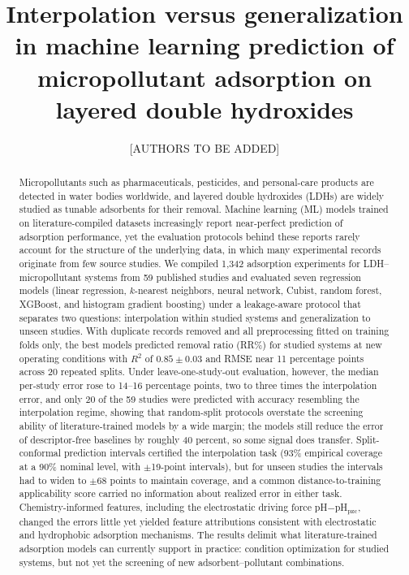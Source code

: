 \documentclass[review,12pt,authoryear]{elsarticle}
\begin{document}
\begin{frontmatter}

\title{Interpolation versus generalization in machine learning prediction
of micropollutant adsorption on layered double hydroxides}

\author[inst1]{[AUTHORS TO BE ADDED]}

\begin{abstract}
Micropollutants such as pharmaceuticals, pesticides, and personal-care
products are detected in water bodies worldwide, and layered double
hydroxides (LDHs) are widely studied as tunable adsorbents for their
removal.
Machine learning (ML) models trained on literature-compiled datasets
increasingly report near-perfect prediction of adsorption performance, yet
the evaluation protocols behind these reports rarely account for the
structure of the underlying data, in which many experimental records
originate from few source studies. We compiled 1,342 adsorption experiments
for LDH--micropollutant systems from 59 published studies and evaluated
seven regression models (linear regression, $k$-nearest neighbors, neural
network, Cubist, random forest, XGBoost, and histogram gradient boosting)
under a leakage-aware protocol that separates two questions: interpolation
within studied systems and generalization to unseen studies. With
duplicate records removed and all preprocessing fitted on training folds
only, the best models predicted removal ratio (RR\%) for studied systems
at new operating conditions with $R^2$ of $0.85 \pm 0.03$ and RMSE near
11 percentage points across 20 repeated splits. Under leave-one-study-out evaluation, however, the median
per-study error rose to 14--16 percentage points, two to three times the
interpolation error, and only 20 of the 59 studies were predicted with
accuracy resembling the interpolation regime, showing that random-split
protocols overstate the screening ability of literature-trained models by
a wide margin; the models still reduce the error of descriptor-free
baselines by roughly 40 percent, so some signal does transfer. Split-conformal prediction intervals certified the
interpolation task (93\% empirical coverage at a 90\% nominal level, with
$\pm$19-point intervals), but for unseen studies the intervals had to
widen to $\pm$68 points to maintain coverage, and a common
distance-to-training applicability score carried no information about
realized error in either task. Chemistry-informed features, including
the electrostatic driving force pH$-$pH$_{\mathrm{pzc}}$, changed the
errors little yet yielded feature attributions consistent with
electrostatic and hydrophobic adsorption mechanisms. The results
delimit what literature-trained adsorption models can currently support
in practice: condition optimization for studied systems, but not yet the
screening of new adsorbent--pollutant combinations.
\end{abstract}


\end{frontmatter}
\end{document}
